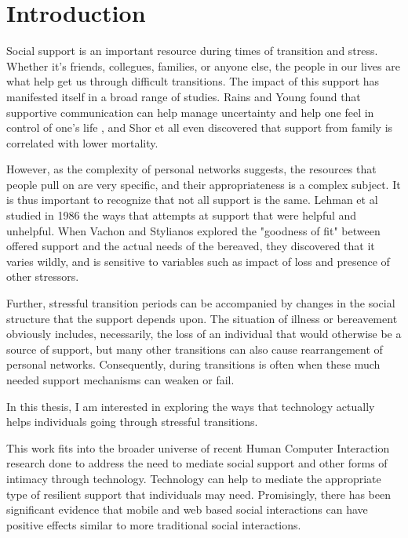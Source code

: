 \chapter{Introduction}
  Social support is an important resource during times of transition and stress.
  Whether it's friends, collegues, families, or anyone else, the people in our lives
  are what help get us through difficult transitions.
  \cite{mikal13}
  The impact of this support has manifested itself in a broad range of studies.
  Rains and Young found that supportive communication can help manage uncertainty and
  help one feel in control of one's life \cite{rains09},
  and Shor et all even discovered that support from
  family is correlated with lower mortality. \cite{shor13}

  However, as the complexity of personal networks suggests, the resources that people pull on
  are very specific,
  and their appropriateness is a complex subject.
  It is thus important to recognize that not all support is the same.
  Lehman et al studied in 1986 the ways that attempts at support that were helpful and unhelpful.
  \cite{lehman86}
  When Vachon and Stylianos explored the "goodness of fit" between offered support and the actual needs of
  the bereaved, they discovered that it varies wildly, and is sensitive to variables such as impact of loss
  and presence of other stressors.
  \cite{vachon88}
  
  Further, stressful transition periods can be accompanied by changes in the social structure
  that the support depends upon.
  The situation of illness or bereavement obviously includes, necessarily,
  the loss of an individual that would otherwise be a source of support,
  but many other transitions can also cause rearrangement of personal networks.
  Consequently, during transitions is often when these much needed
  support mechanisms can weaken or fail.
  \cite{mikal13}

  In this thesis, I am interested in exploring
  the ways that technology actually helps individuals going
  through stressful transitions.

  This work fits into the broader universe of
  recent Human Computer Interaction research
  done to address the need to mediate social support
  and other forms of intimacy through technology.
  \cite{hassenzhal12}
  Technology can help to mediate the appropriate type of resilient support
  that individuals may need.
  Promisingly, there has been significant evidence that
  mobile and web based social interactions can have positive effects similar
  to more traditional social interactions.
  \cite{shaw02, hjo14}

